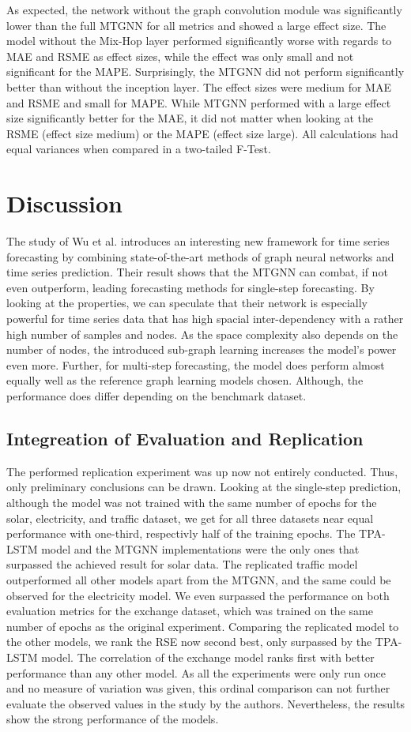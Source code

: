 \documentclass[letterpaper, twocolumn,11pt]{article}
\begin{document}
As expected, the network without the graph convolution module was significantly lower than the full MTGNN for all metrics and showed a large effect size.
The model without the Mix-Hop layer performed significantly worse with regards to MAE and RSME as effect sizes, while the effect was only small and not significant for the MAPE.
Surprisingly, the MTGNN did not perform significantly better than without the inception layer. The effect sizes were medium for MAE and RSME and small for MAPE.
While MTGNN performed with a large effect size significantly better for the MAE, it did not matter when looking at the RSME (effect size medium) or the MAPE (effect size large).
All calculations had equal variances when compared in a two-tailed F-Test.

    \section{Discussion}
	The study of Wu et al. introduces an interesting new framework for time series forecasting by combining state-of-the-art methods of graph neural networks and time series prediction.
    Their result shows that the MTGNN can combat, if not even outperform, leading forecasting methods for single-step forecasting. By looking at the properties, we can speculate that their network is especially powerful for time series data that has high spacial inter-dependency with a rather high number of samples and nodes.
    As the space complexity also depends on the number of nodes,  the introduced sub-graph learning increases the model's power even more.
   Further, for multi-step forecasting, the model does perform almost equally well as the reference graph learning models chosen. Although, the performance does differ depending on the benchmark dataset.

    \subsection{Integreation of Evaluation and Replication}
The performed replication experiment was up now not entirely conducted. Thus, only preliminary conclusions can be drawn.
Looking at the single-step prediction, although the model was not trained with the same number of epochs for the solar, electricity, and traffic dataset, we get for all three datasets near equal performance with one-third, respectivly half of the training epochs.
The TPA-LSTM model and the MTGNN implementations were the only ones that surpassed the achieved result for solar data. The replicated traffic model outperformed all other models apart from the MTGNN, and the same could be observed for the electricity model.
We even surpassed the performance on both evaluation metrics for the exchange dataset, which was trained on the same number of epochs as the original experiment. Comparing the replicated model to the other models, we rank the RSE now second best, only surpassed by the TPA-LSTM model. The correlation of the exchange model ranks first with better performance than any other model.
As all the experiments were only run once and no measure of variation was given, this ordinal comparison can not further evaluate the observed values in the study by the authors. Nevertheless, the results show the strong performance of the models.
\end{document}
